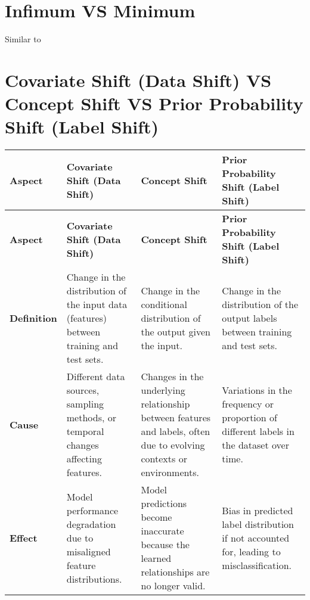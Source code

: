 \section{Infimum VS Minimum}\label{Infimum VS Minimum}
Similar to 



\section{Covariate Shift (Data Shift) VS Concept Shift VS Prior Probability Shift (Label Shift) \cite{chatgpt}} \label{Covariate Shift (Data Shift) VS Concept Shift VS Prior Probability Shift (Label Shift)}

\begin{longtable}{|m{2cm}|m{4.5cm}|m{4.5cm}|m{4.5cm}|}
    \hline
    
    \textbf{Aspect} & \textbf{Covariate Shift (Data Shift)} & \textbf{Concept Shift} & \textbf{Prior Probability Shift (Label Shift)} \\ \hline
    \endfirsthead

    \hline
    \textbf{Aspect} & \textbf{Covariate Shift (Data Shift)} & \textbf{Concept Shift} & \textbf{Prior Probability Shift (Label Shift)} \\ \hline
    \endhead
    
    \hline\endfoot
    
    \hline\endlastfoot
    
    \textbf{Definition} & Change in the distribution of the input data (features) between training and test sets. & Change in the conditional distribution of the output given the input. & Change in the distribution of the output labels between training and test sets. \\ \hline
    
    \textbf{Cause} & Different data sources, sampling methods, or temporal changes affecting features. & Changes in the underlying relationship between features and labels, often due to evolving contexts or environments. & Variations in the frequency or proportion of different labels in the dataset over time. \\ \hline

    \textbf{Effect} & Model performance degradation due to misaligned feature distributions. & Model predictions become inaccurate because the learned relationships are no longer valid. & Bias in predicted label distribution if not accounted for, leading to misclassification. \\ \hline


\end{longtable}
